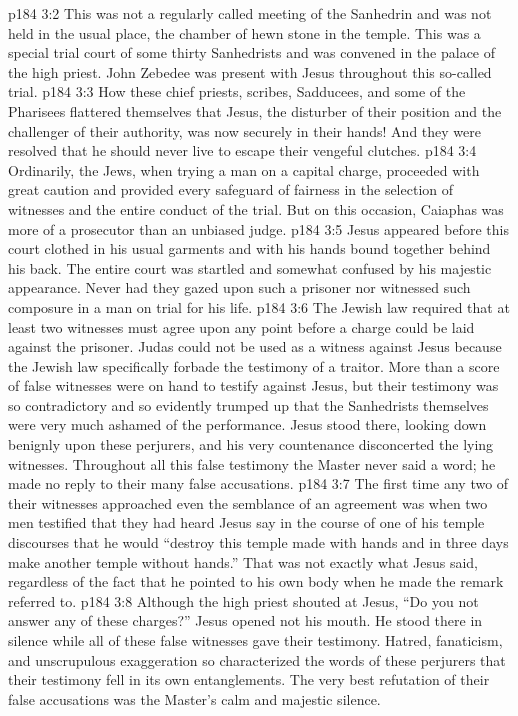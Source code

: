 \vs p184 3:2 This was not a regularly called meeting of the Sanhedrin and was not held in the usual place, the chamber of hewn stone in the temple. This was a special trial court of some thirty Sanhedrists and was convened in the palace of the high priest. John Zebedee was present with Jesus throughout this so\hyp{}called trial.
\vs p184 3:3 How these chief priests, scribes, Sadducees, and some of the Pharisees flattered themselves that Jesus, the disturber of their position and the challenger of their authority, was now securely in their hands! And they were resolved that he should never live to escape their vengeful clutches.
\vs p184 3:4 Ordinarily, the Jews, when trying a man on a capital charge, proceeded with great caution and provided every safeguard of fairness in the selection of witnesses and the entire conduct of the trial. But on this occasion, Caiaphas was more of a prosecutor than an unbiased judge.
\pc \vs p184 3:5 Jesus appeared before this court clothed in his usual garments and with his hands bound together behind his back. The entire court was startled and somewhat confused by his majestic appearance. Never had they gazed upon such a prisoner nor witnessed such composure in a man on trial for his life.
\pc \vs p184 3:6 The Jewish law required that at least two witnesses must agree upon any point before a charge could be laid against the prisoner. Judas could not be used as a witness against Jesus because the Jewish law specifically forbade the testimony of a traitor. More than a score of false witnesses were on hand to testify against Jesus, but their testimony was so contradictory and so evidently trumped up that the Sanhedrists themselves were very much ashamed of the performance. Jesus stood there, looking down benignly upon these perjurers, and his very countenance disconcerted the lying witnesses. Throughout all this false testimony the Master never said a word; he made no reply to their many false accusations.
\vs p184 3:7 The first time any two of their witnesses approached even the semblance of an agreement was when two men testified that they had heard Jesus say in the course of one of his temple discourses that he would “destroy this temple made with hands and in three days make another temple without hands.” That was not exactly what Jesus said, regardless of the fact that he pointed to his own body when he made the remark referred to.
\vs p184 3:8 Although the high priest shouted at Jesus, “Do you not answer any of these charges?” Jesus opened not his mouth. He stood there in silence while all of these false witnesses gave their testimony. Hatred, fanaticism, and unscrupulous exaggeration so characterized the words of these perjurers that their testimony fell in its own entanglements. The very best refutation of their false accusations was the Master’s calm and majestic silence.
